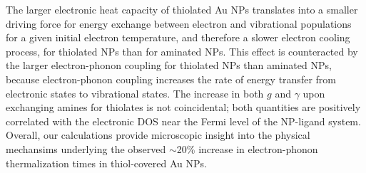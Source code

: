 The larger electronic heat capacity of thiolated Au NPs translates into a smaller driving force for energy exchange between electron and vibrational populations for a given initial electron temperature, and therefore a slower electron cooling process, for thiolated NPs than for aminated NPs. This effect is counteracted by the larger electron-phonon coupling for thiolated NPs than aminated NPs, because electron-phonon coupling increases the rate of energy transfer from electronic states to vibrational states. The increase in both $g$ and $\gamma$ upon exchanging amines for thiolates is not coincidental; both quantities are positively correlated with the electronic DOS near the Fermi level of the NP-ligand system. Overall, our calculations provide microscopic insight into the physical mechansims underlying the observed $\sim$20\% increase in electron-phonon thermalization times in thiol-covered Au NPs.
